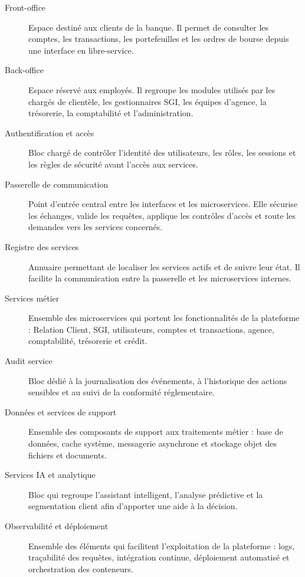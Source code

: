 \documentclass[a4paper,12pt]{report}
\begin{document}
\begin{description}
    \item[Front-office] Espace destiné aux clients de la banque. Il permet de consulter
          les comptes, les transactions, les portefeuilles et les ordres de bourse depuis
          une interface en libre-service.

    \item[Back-office] Espace réservé aux employés. Il regroupe les modules utilisés par
          les chargés de clientèle, les gestionnaires SGI, les équipes d'agence, la
          trésorerie, la comptabilité et l'administration.

    \item[Authentification et accès] Bloc chargé de contrôler l'identité des utilisateurs,
          les rôles, les sessions et les règles de sécurité avant l'accès aux services.

    \item[Passerelle de communication] Point d'entrée central entre les interfaces et les
          microservices. Elle sécurise les échanges, valide les requêtes, applique les
          contrôles d'accès et route les demandes vers les services concernés.

    \item[Registre des services] Annuaire permettant de localiser les services actifs et
          de suivre leur état. Il facilite la communication entre la passerelle et les
          microservices internes.

    \item[Services métier] Ensemble des microservices qui portent les fonctionnalités de
          la plateforme : Relation Client, SGI, utilisateurs, comptes et transactions,
          agence, comptabilité, trésorerie et crédit.

    \item[Audit service] Bloc dédié à la journalisation des événements, à l'historique des
          actions sensibles et au suivi de la conformité réglementaire.

    \item[Données et services de support] Ensemble des composants de support aux
          traitements métier : base de données, cache système, messagerie asynchrone et
          stockage objet des fichiers et documents.

    \item[Services IA et analytique] Bloc qui regroupe l'assistant intelligent, l'analyse
          prédictive et la segmentation client afin d'apporter une aide à la décision.

    \item[Observabilité et déploiement] Ensemble des éléments qui facilitent l'exploitation
          de la plateforme : logs, traçabilité des requêtes, intégration continue,
          déploiement automatisé et orchestration des conteneurs.
\end{description}
\newpage{}
\end{document}
